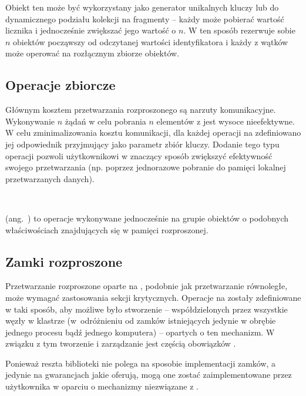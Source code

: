 Obiekt ten może być wykorzystany jako generator unikalnych kluczy
lub do dynamicznego podziału kolekcji na fragmenty -- każdy 
może pobierać wartość licznika i jednocześnie zwiększać jego wartość
o $n$. W ten sposób rezerwuje sobie $n$ obiektów począwszy od odczytanej
wartości identyfikatora i każdy z wątków może operować na rozłącznym
zbiorze obiektów.


\subsection{Operacje zbiorcze\label{sub:Koncepcja-Operacje-zbiorcze}}

Głównym kosztem przetwarzania rozproszonego są narzuty komunikacyjne.
Wykonywanie $n$ żądań w celu pobrania $n$ elementów z 
jest wysoce nieefektywne. W celu zminimalizowania kosztu komunikacji,
dla każdej operacji na  zdefiniowano
jej odpowiednik przyjmujący jako parametr zbiór kluczy. Dodanie tego
typu operacji pozwoli użytkownikowi w znaczący sposób zwiększyć efektywność
swojego przetwarzania (np. poprzez jednorazowe pobranie do pamięci
lokalnej przetwarzanych danych).
\begin{defn}
~\label{def:concept-Operacje-zbiorcze-def}

\noindent {} (ang.~)
to operacje wykonywane jednocześnie na grupie obiektów o podobnych
właściwościach znajdujących się w pamięci rozproszonej.
\end{defn}

\subsection{Zamki rozproszone\label{sub:Koncepcja-Zamki-rozproszone}}

Przetwarzanie rozproszone oparte na ,
podobnie jak przetwarzanie równoległe, może wymagać zastosowania sekcji
krytycznych. Operacje na  zostały
zdefiniowane w taki sposób, aby możliwe było stworzenie 
-- współdzielonych przez wszystkie węzły w klastrze (w~odróżnieniu
od zamków istniejących jedynie w obrębie jednego procesu bądź jednego
komputera) -- opartych o ten mechanizm. W związku z tym tworzenie
i zarządzanie  jest częścią obowiązków
. 

Ponieważ reszta biblioteki nie polega na sposobie implementacji zamków,
a jedynie na gwarancjach jakie oferują, mogą one zostać zaimplementowane
przez użytkownika w oparciu o mechanizmy niezwiązane z .

